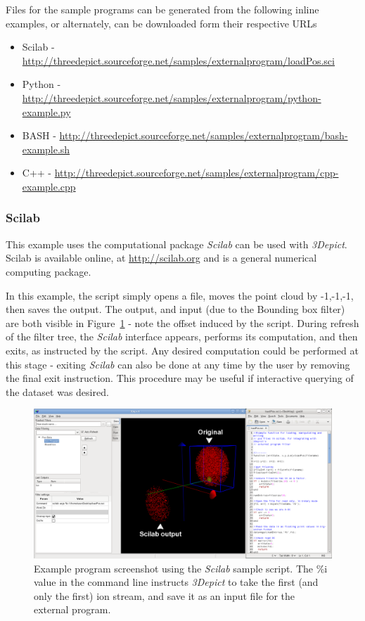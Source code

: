 \documentclass[10pt]{article}
\begin{document}
Files for the sample programs can be generated from the following inline examples, or alternately, can be downloaded form their respective URLs

\begin{itemize}
 \item Scilab - \url{http://threedepict.sourceforge.net/samples/externalprogram/loadPos.sci}
 \item Python - \url{http://threedepict.sourceforge.net/samples/externalprogram/python-example.py}
 \item BASH - \url{http://threedepict.sourceforge.net/samples/externalprogram/bash-example.sh}
 \item C++ - \url{http://threedepict.sourceforge.net/samples/externalprogram/cpp-example.cpp}
\end{itemize}



\subsubsection{Scilab}
This example uses the computational package \emph{Scilab} can be used with \emph{3Depict}. Scilab is available online, at \url{http://scilab.org} and is a general numerical computing package. 

In this example, the script simply opens a file, moves the point cloud by -1,-1,-1, then saves the output. The output, and input (due to the Bounding box filter) are both visible in Figure~\ref{fig:externalProgScilabSample} - note the offset induced by the script. During refresh of the filter tree, the \emph{Scilab} interface appears, performs its computation, and then exits, as instructed by the script. Any desired computation could be performed at this stage - exiting \emph{Scilab} can also be done at any time by the user by removing the final exit instruction. This procedure may be useful if interactive querying of the dataset was desired.

\begin{figure}
\begin{center}
 \includegraphics[keepaspectratio=true,width=0.9 \textwidth]{./figures/externalProgScilab.png}
 \caption{Example program screenshot using the \emph{Scilab} sample script. The \%i value in the command line instructs \emph{3Depict} to take the first (and only the first) ion stream, and save it as an input file for the external program. }
 \label{fig:externalProgScilabSample}
\end{center}
\end{figure}
\end{document}
